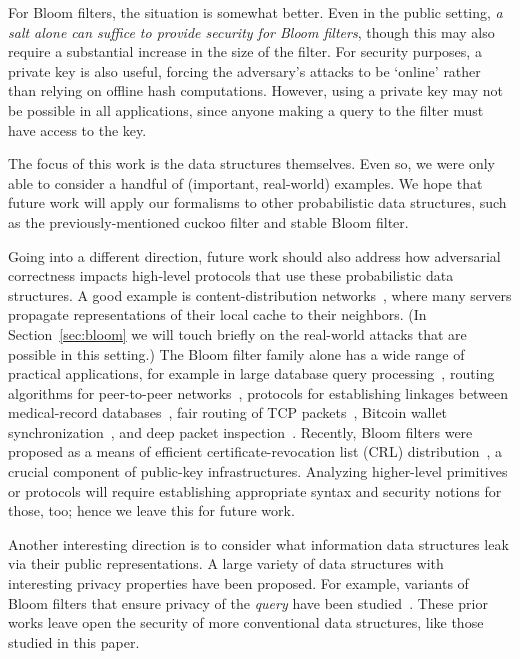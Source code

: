 For Bloom filters, the situation is somewhat better. Even in the public setting, \emph{a salt alone can suffice to provide security for Bloom filters}, though this may also require a substantial increase in the size of the filter. For security purposes, a private key is also useful, forcing the adversary's attacks to be `online' rather than relying on offline hash computations. However, using a private key may not be possible in all applications, since anyone making a query to the filter must have access to the key.

%
The focus of this work is the data structures themselves.  Even so, we
were only able to consider a handful of (important, real-world)
examples.  We hope that future work will apply our formalisms to
other probabilistic data structures, such as the previously-mentioned
cuckoo filter and stable Bloom filter.

Going into a different direction, future work should
also address how adversarial correctness impacts high-level protocols that use
these probabilistic data structures. A good example is content-distribution
networks~\cite{byers2002informed}, where many servers propagate representations
of their local cache to their neighbors. (In Section~\ref{sec:bloom} we will
touch briefly on the real-world attacks that are possible in this setting.) The
Bloom filter family alone has a wide range of practical applications, for
example in large database query processing~\cite{broder2004network}, routing
algorithms for peer-to-peer networks~\cite{reynolds2003efficient}, protocols for
establishing linkages between medical-record databases~\cite{schnell2011novel},
fair routing of TCP packets~\cite{feng2001stochastic}, Bitcoin wallet
synchronization~\cite{gervais2014privacy}, and deep packet inspection~\cite{tarkoma2012theory}.
Recently, Bloom filters were proposed as a
means of efficient certificate-revocation list (CRL)
distribution~\cite{larisch2017crlite}, a crucial component of public-key
infrastructures.
%
Analyzing higher-level primitives or protocols will require establishing
appropriate syntax and security notions for those, too; hence we leave this for
future work.

Another interesting direction is to consider what information data structures
leak via their public representations. A large variety of data structures with
interesting privacy properties have been proposed. For example, variants of
Bloom filters that ensure privacy of the \emph{query} have been
studied~\cite{bellovin2004privacy,nojima2009cryptographically}. These prior works
leave open the security of more conventional data structures, like those studied
in this paper.



